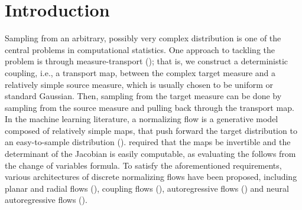   \section{Introduction}\label{sec:intro}
  Sampling from an arbitrary, possibly very complex distribution is
  one of the central problems in computational statistics. One
  approach to tackling the problem is through measure-transport
  (\cite{measure-transport}); that is, we construct a deterministic
  coupling, i.e., a transport map, between the complex target measure
  and a relatively simple source measure, which is usually chosen to
  be uniform or standard Gaussian. Then, sampling from the target
  measure can be done by sampling from the source measure and pulling
  back through the transport map. In the machine learning literature,
  a normalizing flow is  a generative model composed of
  relatively simple maps, that push forward the target distribution to
  an easy-to-sample distribution (\cite{NormalizingFlowIntro}).
   required that the maps be
  invertible and the determinant of the Jacobian is easily computable,
  as evaluating the  follows from the change of variables
  formula. To satisfy the aforementioned requirements, various
  architectures of discrete normalizing flows have been proposed,
  including planar and radial flows (\cite{PlanarFlow}), coupling
  flows (\cite{CouplingFlows}), autoregressive flows
  (\cite{autoregressiveflow}) and neural autoregressive flows
  (\cite{NeuralAutoFlow}).

